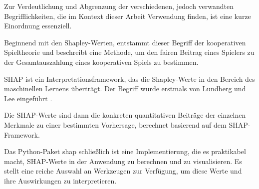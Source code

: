 Zur Verdeutlichung und Abgrenzung der verschiedenen, jedoch verwandten Begrifflichkeiten, die im Kontext dieser Arbeit Verwendung finden, 
ist eine kurze Einordnung essenziell.

Beginnend mit den Shapley-Werten, entstammt dieser Begriff der kooperativen Spieltheorie und beschreibt eine Methode, 
um den fairen Beitrag eines Spielers zu der Gesamtauszahlung eines kooperativen Spiels zu bestimmen. 

\acf{SHAP} ist ein Interpretationsframework, das die Shapley-Werte in den Bereich des maschinellen Lernens überträgt. 
Der Begriff wurde erstmals von Lundberg und Lee eingeführt \cite[S. 1]{NIPS2017_8a20a862}.

Die \acs{SHAP}-Werte sind dann die konkreten quantitativen Beiträge der einzelnen Merkmale zu einer bestimmten Vorhersage, 
berechnet basierend auf dem \acs{SHAP}-Framework.

Das Python-Paket \textsf{shap} schließlich ist eine Implementierung, die es praktikabel macht, \acs{SHAP}-Werte in der Anwendung zu berechnen 
und zu visualisieren. Es stellt eine reiche Auswahl an Werkzeugen zur Verfügung, um diese Werte und ihre Auswirkungen zu interpretieren.